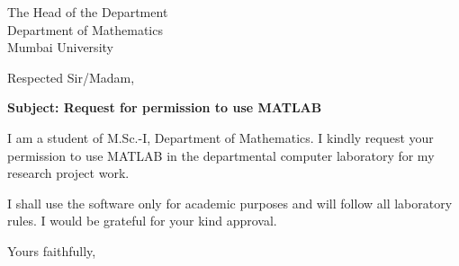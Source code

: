 \documentclass{letter}
\begin{document}
	\begin{letter}{The Head of the Department\\Department of Mathematics\\Mumbai University}
		\opening{Respected Sir/Madam,}
		
		\textbf{Subject: Request for permission to use MATLAB}
		
		I am a student of M.Sc.-I, Department of Mathematics. I kindly request your permission to use MATLAB in the departmental computer laboratory for my research project work.
		
		I shall use the software only for academic purposes and will follow all laboratory rules. I would be grateful for your kind approval.
		
		\closing{Yours faithfully,}
	\end{letter}
\end{document}
